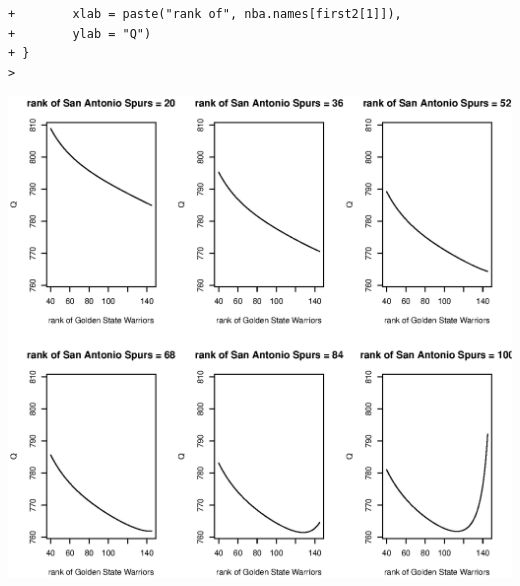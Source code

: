 \documentclass[11pt]{report}
\theoremstyle{definition}
\theoremstyle{remark}
\begin{document}
\begin{enumerate}
\begin{enumerate}
\begin{verbatim}
+        xlab = paste("rank of", nba.names[first2[1]]),
+        ylab = "Q")
+ }
> \end{verbatim}
   \includegraphics[width=\textwidth]{a2_profile.eps}
    \end{enumerate}

\end{enumerate}
\end{document}
